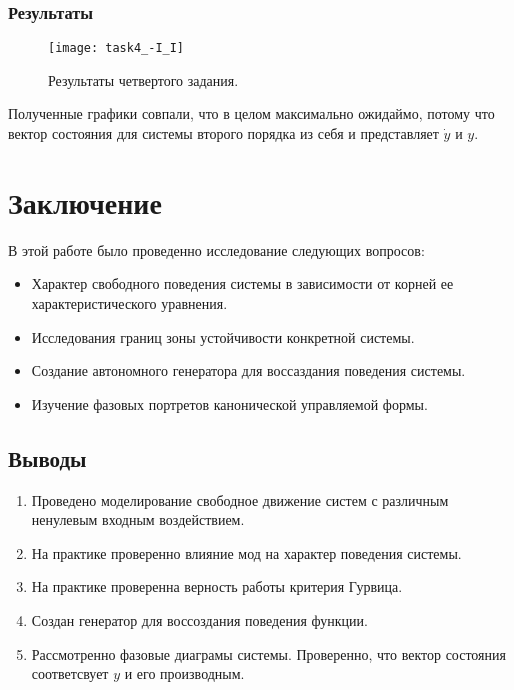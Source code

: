 \documentclass[16pt]{article}
\begin{document}
\newpage
\subsubsection{Результаты}
\begin{figure}[H]
	\centering
	\texttt{[image: task4\_-I\_I]}
	\caption{Результаты четвертого задания.}
	\label{fig:fig9}
\end{figure}
Полученные графики совпали, что в целом максимально ожидаймо, потому что вектор состояния для системы второго порядка из себя и представляет \(\dot{y}\) и \(y\).

\newpage

\section{Заключение}
В этой работе было проведенно исследование следующих вопросов:
\begin{itemize}
    \item Характер свободного поведения системы в зависимости от корней ее характеристического уравнения. 
    \item Исследования границ зоны устойчивости конкретной системы. 
    \item Создание автономного генератора для воссаздания поведения системы. 
    \item Изучение фазовых портретов канонической управляемой формы.
\end{itemize} 
\subsection{Выводы}
\begin{enumerate}
   \item Проведено моделирование свободное движение систем с различным ненулевым входным воздействием.
   \item На практике проверенно влияние мод на характер поведения системы.
   \item На практике проверенна верность работы критерия Гурвица.
   \item Создан генератор для воссоздания поведения функции.
   \item Рассмотренно фазовые диаграмы системы. Проверенно, что вектор состояния соответсвует \(y\) и его производным. 
\end{enumerate}
\end{document}
